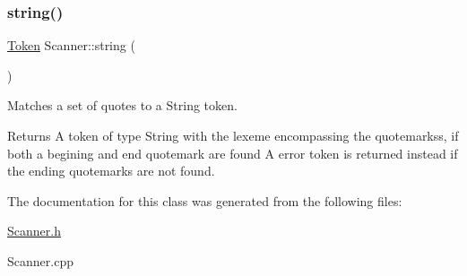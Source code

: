 \subsubsection{\texorpdfstring{string()}{string()}}
{\footnotesize\ttfamily \hyperlink{struct_token}{Token} Scanner\+::string (\begin{DoxyParamCaption}{ }\end{DoxyParamCaption})\hspace{0.3cm}{\ttfamily [private]}}



Matches a set of quotes to a String token. 

\begin{DoxyReturn}{Returns}
A token of type String with the lexeme encompassing the quotemarkss, if both a begining and end quotemark are found A error token is returned instead if the ending quotemarks are not found. 
\end{DoxyReturn}


The documentation for this class was generated from the following files\+:\begin{DoxyCompactItemize}
\item 
\hyperlink{_scanner_8h}{Scanner.\+h}\item 
Scanner.\+cpp\end{DoxyCompactItemize}
